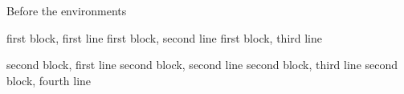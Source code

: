 Before the environments
\begin{one}
first block, first line
first block, second line
	first block, third line
	\begin{two}
		second block, first line
second block, second line
second block, third line
second block, fourth line
\end{two}
\end{one}
